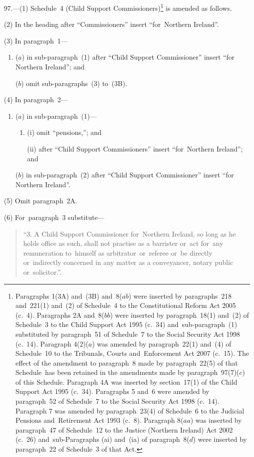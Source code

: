 \documentclass[12pt,a4paper]{article}
\begin{document}
97.---(1)  Schedule~4 (Child Support Commissioners)\footnote{Paragraphs 1(3A) and~(3B) and~8($ab$) were inserted by paragraphs~218 and~221(1) and~(2) of Schedule~4 to the Constitutional Reform Act 2005 (c.~4). Paragraphs 2A and~8($bb$) were inserted by paragraph~18(1) and~(2) of Schedule~3 to the Child Support Act 1995 (c.~34) and~sub-paragraph~(1) substituted by paragraph~51 of Schedule~7 to the Social Security Act 1998 (c.~14). Paragraph 4(2)($a$) was amended by paragraph~22(1) and~(4) of Schedule~10 to the Tribunals, Courts and~Enforcement Act 2007 (c.~15). The effect of the amendment to paragraph~8 made by paragraph~22(5) of that Schedule~has been retained in the amendments made by paragraph~97(7)($c$) of this Schedule. Paragraph 4A was inserted by section~17(1) of the Child Support Act 1995 (c.~34). Paragraphs 5 and~6 were amended by paragraph~52 of Schedule~7 to the Social Security Act 1998 (c.~14). Paragraph 7 was amended by paragraph~23(4) of Schedule~6 to the Judicial Pensions and~Retirement Act 1993 (c.~8). Paragraph 8($aa$) was inserted by paragraph~47 of Schedule~12 to the Justice (Northern Ireland) Act 2002 (c.~26) and~sub-Paragraphs (ai) and~(ia) of paragraph~8($d$) were inserted by paragraph~22 of Schedule~3 of that Act.} is amended as follows.

(2) In the heading after “Commissioners” insert “for~Northern Ireland”.

(3) In paragraph~1—
\begin{enumerate}\item[]
($a$) in sub-paragraph~(1) after “Child Support Commissioner” insert “for Northern Ireland”; and

($b$) omit sub-paragraphs~(3) to~(3B).
\end{enumerate}

(4) In paragraph~2—
\begin{enumerate}\item[]
($a$) in sub-paragraph~(1)—
\begin{enumerate}\item[]
(i) omit “pensions,”; and

(ii) after “Child Support Commissioners” insert “for~Northern Ireland”; and
\end{enumerate}

($b$) in sub-paragraph~(2) after “Child Support Commissioner” insert “for Northern Ireland”.
\end{enumerate}

(5) Omit paragraph~2A.

(6) For~paragraph~3 substitute—
\begin{quotation}
“3.  A Child Support Commissioner for~Northern Ireland, so long as he holds office as such, shall not practise as a barrister or~act for~any remuneration to~himself as arbitrator~or~referee or~be directly or~indirectly concerned in any matter as a conveyancer, notary public or~solicitor.”.
\end{quotation}
\end{document}
